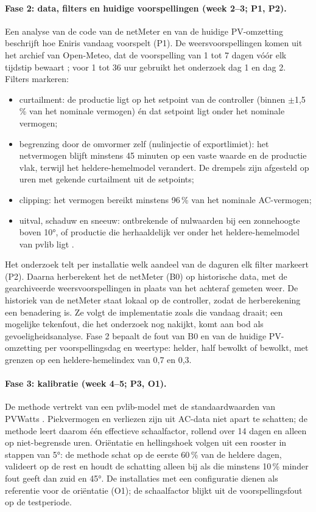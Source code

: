 \paragraph{Fase 2: data, filters en huidige voorspellingen (week 2--3; P1, P2).}
Een analyse van de code van de netMeter en van de huidige PV-omzetting beschrijft hoe Eniris vandaag voorspelt (P1). De weersvoorspellingen komen uit het archief van Open-Meteo, dat de voorspelling van 1 tot 7 dagen vóór elk tijdstip bewaart \autocite{OpenMeteoPrevRuns}; voor 1 tot 36 uur gebruikt het onderzoek dag 1 en dag 2. Filters markeren:
\begin{itemize}
  \item curtailment: de productie ligt op het setpoint van de controller (binnen $\pm$1,5\,\% van het nominale vermogen) én dat setpoint ligt onder het nominale vermogen;
  \item begrenzing door de omvormer zelf (nulinjectie of exportlimiet): het netvermogen blijft minstens 45 minuten op een vaste waarde en de productie vlak, terwijl het heldere-hemelmodel verandert. De drempels zijn afgesteld op uren met gekende curtailment uit de setpoints;
  \item clipping: het vermogen bereikt minstens 96\,\% van het nominale AC-vermogen;
  \item uitval, schaduw en sneeuw: ontbrekende of nulwaarden bij een zonnehoogte boven 10°, of productie die herhaaldelijk ver onder het heldere-hemelmodel van pvlib ligt \autocite{Anderson2023}.
\end{itemize}
Het onderzoek telt per installatie welk aandeel van de daguren elk filter markeert (P2). Daarna herberekent het de netMeter (B0) op historische data, met de gearchiveerde weersvoorspellingen in plaats van het achteraf gemeten weer. De historiek van de netMeter staat lokaal op de controller, zodat de herberekening een benadering is. Ze volgt de implementatie zoals die vandaag draait; een mogelijke tekenfout, die het onderzoek nog nakijkt, komt aan bod als gevoeligheidsanalyse. Fase 2 bepaalt de fout van B0 en van de huidige PV-omzetting per voorspellingsdag en weertype: helder, half bewolkt of bewolkt, met grenzen op een heldere-hemelindex van 0,7 en 0,3.

\paragraph{Fase 3: kalibratie (week 4--5; P3, O1).}
De methode vertrekt van een pvlib-model met de standaardwaarden van PVWatts \autocite{Dobos2014}. Piekvermogen en verliezen zijn uit AC-data niet apart te schatten; de methode leert daarom één effectieve schaalfactor, rollend over 14 dagen en alleen op niet-begrensde uren. Oriëntatie en hellingshoek volgen uit een rooster in stappen van 5°: de methode schat op de eerste 60\,\% van de heldere dagen, valideert op de rest en houdt de schatting alleen bij als die minstens 10\,\% minder fout geeft dan zuid en 45°. De installaties met een configuratie dienen als referentie voor de oriëntatie (O1); de schaalfactor blijkt uit de voorspellingsfout op de testperiode.

